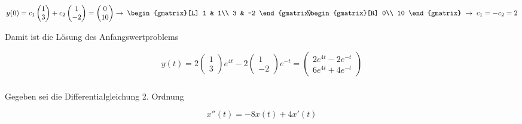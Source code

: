 \begin{solution}
    \begin{equation*}
        y(0) = c_1 \begin{pmatrix} 1 \\ 3 \end{pmatrix} + c_2 \begin{pmatrix} 1 \\ -2 \end{pmatrix} = \begin{pmatrix} 0 \\ 10 \end{pmatrix} \rightarrow \; \begin{gmatrix}[L]
            1 & 1\\
            3 & -2
        \end{gmatrix} \hspace{-0.75em} \begin{gmatrix}[R]
            0\\
            10
        \end{gmatrix} \; \rightarrow \; c_1 = -c_2 = 2
    \end{equation*}

    Damit ist die Lösung des Anfangswertproblems

    \begin{equation*}
        y(t) = 2 \begin{pmatrix} 1 \\ 3 \end{pmatrix} e^{4t} - 2 \begin{pmatrix} 1 \\ -2 \end{pmatrix} e^{-t} = \begin{pmatrix} 2e^{4t} - 2e^{-t} \\ 6e^{4t} + 4e^{-t} \end{pmatrix}
    \end{equation*}

\end{solution}

\newpage

\subsubsection{} %

Gegeben sei die Differentialgleichung 2. Ordnung

\begin{equation}
    x''(t) = -8x(t) + 4x'(t)  
    \tag{$\dagger$}
\end{equation}

